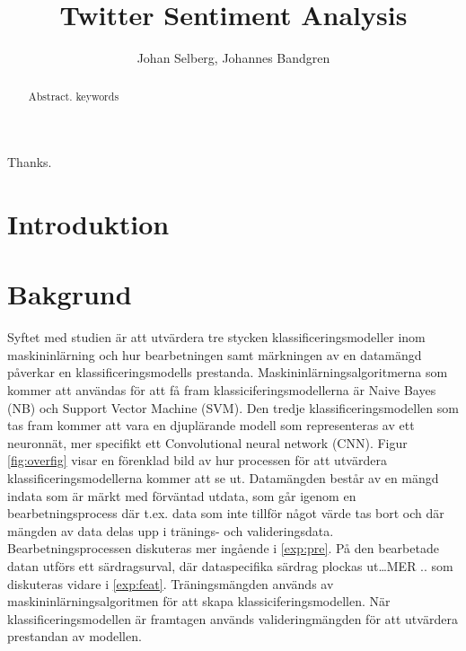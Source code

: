 \documentclass{kaumasters} %
\title{Twitter Sentiment Analysis}
\author{Johan Selberg, Johannes Bandgren}
\institute{Department of Computer Science}
\begin{document}
\maketitle




\frontmatter
\begin{abstract}
  Abstract.
  \keywords keywords
\end{abstract}
\approvalpage%
\begin{acknowledgements}
  Thanks.
\end{acknowledgements}

\tableofcontents{}
\listoffigures
\listoftables
\mainmatter
\pagestyle{fancy}
\fancyhead[LE,RO]{\thepage}
\fancyhead[RE,LO]{\rightmark}
\fancyfoot{}
\chapter{Introduktion}

\newpage


\chapter{Bakgrund}
Syftet med studien är att utvärdera tre stycken klassificeringsmodeller inom maskininlärning och hur bearbetningen samt märkningen av en datamängd påverkar en klassificeringsmodells prestanda. Maskininlärningsalgoritmerna som kommer att användas för att få fram klassiciferingsmodellerna är Naive Bayes (NB) och Support Vector Machine  (SVM). Den tredje klassificeringsmodellen som tas fram kommer att vara en djuplärande modell  som representeras av ett neuronnät, mer specifikt ett Convolutional neural network (CNN). Figur \ref{fig:overfig} visar en förenklad bild av hur processen för att utvärdera klassificeringsmodellerna kommer att se ut. Datamängden består av en mängd indata som är märkt med förväntad utdata, som går igenom en bearbetningsprocess där t.ex. data som inte tillför något värde tas bort och där mängden av data delas upp i tränings- och valideringsdata.  Bearbetningsprocessen diskuteras mer ingående i \ref{exp:pre}. På den bearbetade datan utförs ett särdragsurval, där dataspecifika särdrag plockas ut…MER .. som diskuteras vidare i \ref{exp:feat}. Träningsmängden används av maskininlärningsalgoritmen för att skapa klassiciferingsmodellen. När klassificeringsmodellen är framtagen används valideringmängden för att utvärdera prestandan av modellen.
\end{document}
